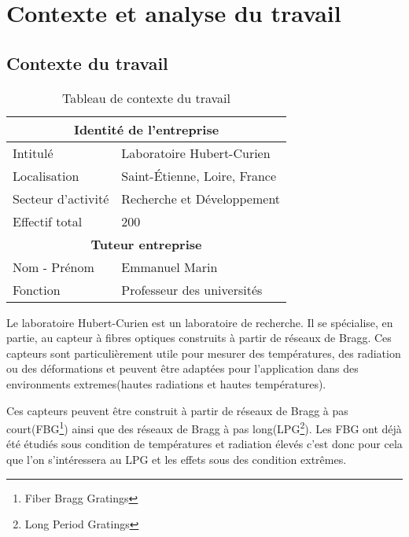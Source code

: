 \documentclass[11pt, openright]{book}
\begin{document}



    
    \newpage

    \section{Contexte et analyse du travail}
     \subsection{Contexte du travail}


      \begin{table}[ht!]
         \centering
         \caption{Tableau de contexte du travail}
         \label{tab:label}
         \begin{tabular}{|l|l|}
            \hline
            \multicolumn{2}{|c|}{\textbf{Identité de l'entreprise}}\\
            \hline
            Intitulé & Laboratoire Hubert-Curien\\
            \hline
            Localisation & Saint-Étienne, Loire, France\\
            \hline
            Secteur d'activité & Recherche et Développement\\
            \hline
            Effectif total & 200\\
            \hline
            \multicolumn{2}{|c|}{\textbf{Tuteur entreprise}}\\
            \hline
            Nom - Prénom & Emmanuel Marin\\
            \hline
            Fonction & Professeur des universités\\
            \hline
         \end{tabular}
     \end{table}


    Le laboratoire Hubert-Curien est un laboratoire de recherche. Il se spécialise, en partie, au capteur à fibres optiques construits à partir de réseaux de Bragg. Ces capteurs sont particulièrement utile pour mesurer des températures, des radiation ou des déformations et peuvent être adaptées pour l'application dans des environments extremes(hautes radiations et hautes températures). 
    
    Ces capteurs peuvent être construit à partir de réseaux de Bragg à pas court(FBG\footnote[1]{Fiber Bragg Gratings}) ainsi que des réseaux de Bragg à pas long(LPG\footnote[2]{Long Period Gratings}). Les FBG ont déjà été étudiés sous condition de températures et radiation élevés c'est donc pour cela que l'on s'intéressera au LPG et les effets sous des condition extrêmes.  
    
\end{document}
